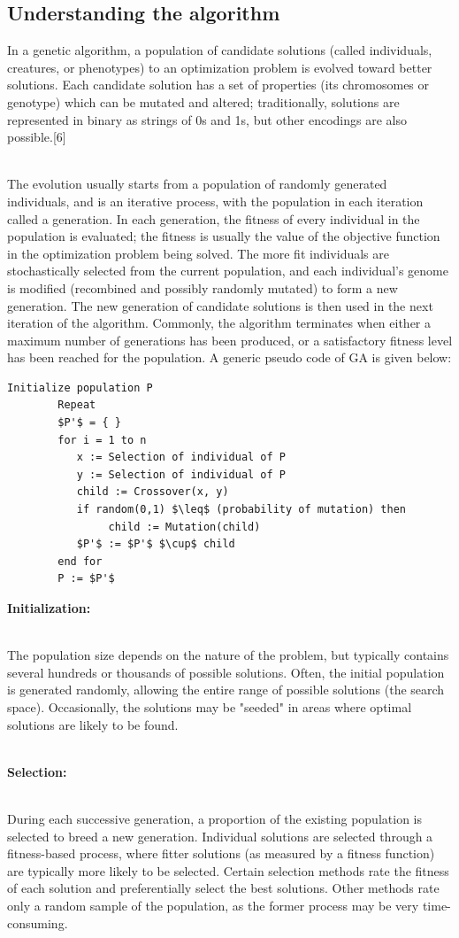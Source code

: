 \documentclass[a4paper, 12pt]{article}
\begin{document}
\subsection{Understanding the algorithm}
In a genetic algorithm, a population of candidate solutions (called individuals, creatures, or phenotypes) to an optimization problem is evolved toward better solutions. Each candidate solution has a set of properties (its chromosomes or genotype) which can be mutated and altered; traditionally, solutions are represented in binary as strings of 0s and 1s, but other encodings are also possible.[6]\par
\noindent
\\The evolution usually starts from a population of randomly generated individuals, and is an iterative process, with the population in each iteration called a generation. In each generation, the fitness of every individual in the population is evaluated; the fitness is usually the value of the objective function in the optimization problem being solved. The more fit individuals are stochastically selected from the current population, and each individual's genome is modified (recombined and possibly randomly mutated) to form a new generation. The new generation of candidate solutions is then used in the next iteration of the algorithm. Commonly, the algorithm terminates when either a maximum number of generations has been produced, or a satisfactory fitness level has been reached for the population.
 A generic pseudo code of GA is given below:
\begin{lstlisting}[mathescape]
        Initialize population P
        Repeat
        $P'$ = { }
        for i = 1 to n
           x := Selection of individual of P
           y := Selection of individual of P
           child := Crossover(x, y)
           if random(0,1) $\leq$ (probability of mutation) then
                child := Mutation(child)
           $P'$ := $P'$ $\cup$ child
        end for
        P := $P'$
\end{lstlisting}
\begin{large}\textbf{Initialization:}\end{large}\\
The population size depends on the nature of the problem, but typically contains several hundreds or thousands of possible solutions. Often, the initial population is generated randomly, allowing the entire range of possible solutions (the search space). Occasionally, the solutions may be "seeded" in areas where optimal solutions are likely to be found.\\~\\
\begin{large}\textbf{Selection:}\end{large}\\
During each successive generation, a proportion of the existing population is selected to breed a new generation. Individual solutions are selected through a fitness-based process, where fitter solutions (as measured by a fitness function) are typically more likely to be selected. Certain selection methods rate the fitness of each solution and preferentially select the best solutions. Other methods rate only a random sample of the population, as the former process may be very time-consuming.
\end{document}
